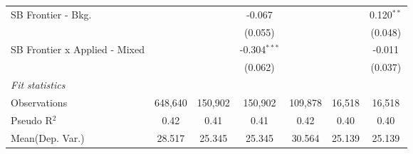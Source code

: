 \begin{tabular}{lcccccc}
   SB Frontier - Bkg.            &               &              & -0.067         &               &              & 0.120$^{**}$\\   
                                 &               &              & (0.055)        &               &              & (0.048)\\   
   SB Frontier x Applied - Mixed &               &              & -0.304$^{***}$ &               &              & -0.011\\   
                                 &               &              & (0.062)        &               &              & (0.037)\\   
   \midrule
   \emph{Fit statistics}\\
   Observations                  & 648,640       & 150,902      & 150,902        & 109,878       & 16,518       & 16,518\\  
   Pseudo R$^2$                  & 0.42          & 0.41         & 0.41           & 0.42          & 0.40         & 0.40\\  
Mean(Dep. Var.) & 28.517 & 25.345 & 25.345 & 30.564 & 25.139 & 25.139 \\
   

\end{tabular}
